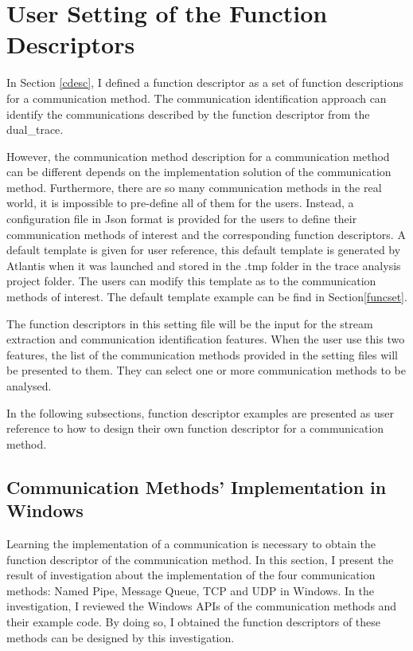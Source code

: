 \section{User Setting of the Function Descriptors}\label{functionset}
In Section \ref{cdesc}, I defined a function descriptor as a set of function descriptions for a communication method. The communication identification approach can identify the communications described by the function descriptor from the dual\_trace.

However, the communication method description for a communication method can be different depends on the implementation solution of the communication method. Furthermore, there are so many communication methods in the real world, it is impossible to pre-define all of them for the users. Instead, a configuration file in Json format is provided for the users to define their communication methods of interest and the corresponding function descriptors. A default template is given for user reference, this default template is generated by Atlantis when it was launched and stored in the .tmp folder in the trace analysis project folder. The users can modify this template as to the communication methods of interest. The default template example can be find in Section\ref{funcset}.

The function descriptors in this setting file will be the input for the stream extraction and communication identification features. When the user use this two features, the list of the communication methods provided in the setting files will be presented to them. They can select one or more communication methods to be analysed. 

In the following subsections, function descriptor examples are presented as user reference to how to design their own function descriptor for a communication method.

\subsection{Communication Methods' Implementation in Windows}\label{windows}
Learning the implementation of a communication is necessary to obtain the function descriptor of the communication method.  In this section, I present the result of investigation about the implementation of the four communication methods: Named Pipe, Message Queue, TCP and UDP in Windows. In the investigation, I reviewed the Windows APIs of the communication methods and their example code. By doing so, I obtained the function descriptors of these methods can be designed by this investigation.

